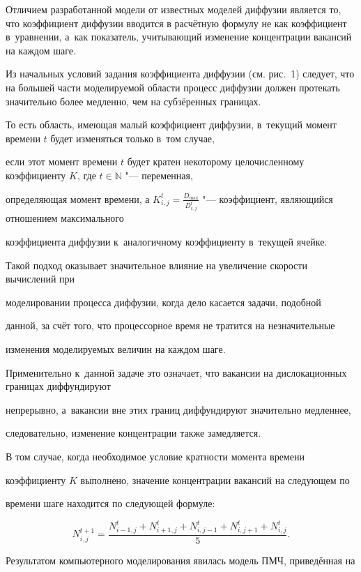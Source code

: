 Отличием разработанной модели от известных моделей диффузии является то,  что коэффициент диффузии вводится в расчётную формулу не как коэффициент в~уравнении,  а~как показатель,  учитывающий изменение концентрации вакансий на каждом шаге.

Из начальных условий задания коэффициента диффузии (см. рис.~1) следует,  что на большей части моделируемой области процесс диффузии должен протекать значительно более медленно,  чем на субзёренных границах.

То есть область,  имеющая малый коэффициент диффузии,  в~текущий момент времени $t$ будет изменяться только в~том случае,

если этот момент времени $t$ будет кратен некоторому целочисленному коэффициенту $K$, где $t\in \mathbb N $ "--- переменная,

определяющая момент времени, а $K_{i, j}^t =\frac{D_{\max }}{D_{i, j}^t }$ "--- коэффициент,  являющийся отношением максимального

коэффициента диффузии к~аналогичному коэффициенту в~текущей ячейке.

Такой подход оказывает значительное влияние на увеличение скорости вычислений при

моделировании процесса диффузии,  когда дело касается задачи,  подобной

данной,  за счёт того,  что процессорное время не тратится на незначительные

изменения моделируемых величин на каждом шаге.

Применительно к~данной задаче это означает,  что вакансии на дислокационных границах диффундируют

непрерывно,  а~вакансии вне этих границ диффундируют значительно медленнее,

следовательно,  изменение концентрации также замедляется.



В том случае,  когда необходимое условие кратности момента времени

коэффициенту $K$ выполнено,  значение концентрации вакансий на следующем по

времени шаге находится по следующей формуле:

\[

N_{i, j}^{t+1} =\frac{N_{i-1, j}^t +N_{i+1, j}^t +N_{i, j-1}^t +N_{i, j+1}^t +N_{i, j}^t }{5}.

\]



Результатом компьютерного моделирования явилась модель ПМЧ,  приведённая на


